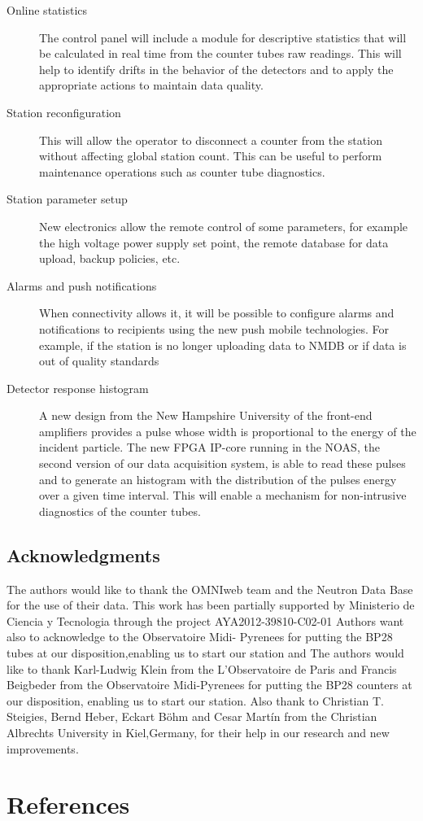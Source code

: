 \documentclass[a4paper]{jpconf}
\begin{document}
\begin{description}
    \item[Online statistics] The control panel will include a module for
        descriptive statistics that will be calculated in real time from the
        counter tubes raw readings. This will help to identify drifts in the
        behavior of the detectors and to apply the appropriate actions to
        maintain data quality.
    \item[Station reconfiguration] This will allow the operator to disconnect a
        counter from the station without affecting global station count. This
        can be useful to perform maintenance operations such as counter tube
        diagnostics. 
    \item[Station parameter setup] New electronics allow the remote control of
        some parameters, for example the high voltage power supply set point,
        the remote database for data upload, backup policies, etc.
    \item[Alarms and push notifications] When connectivity allows it, it will
        be possible to configure alarms and notifications to recipients using
        the new push mobile technologies. For example, if the station is no
        longer uploading data to NMDB or if data is out of quality standards
    \item[Detector response histogram] A new design from the New
        Hampshire University of the front-end amplifiers provides a pulse whose
        width is proportional to the energy of the incident particle. The new
        FPGA IP-core running in the NOAS, the second version of our data
        acquisition system, is able to read these pulses and to generate an
        histogram with the distribution of the pulses energy over a given time
        interval. This will enable a mechanism for non-intrusive diagnostics of
        the counter tubes. 
\end{description}


\subsection*{Acknowledgments} 

The authors would like to thank the OMNIweb team and the Neutron Data Base for
the use of their data. This work has been partially supported by Ministerio de
Ciencia y Tecnologia through the project AYA2012-39810-C02-01 Authors want also
to acknowledge to the Observatoire Midi- Pyrenees for putting the BP28 tubes at
our disposition,enabling us to start our station and The authors would like to
thank Karl-Ludwig Klein from the L’Observatoire de Paris and Francis Beigbeder
from the Observatoire Midi-Pyrenees for putting the BP28 counters at our
disposition, enabling us to start our station. Also thank to Christian T.
Steigies, Bernd Heber, Eckart Böhm and Cesar Martín from the Christian
Albrechts University in Kiel,Germany, for their help in our research and new
improvements.


\section*{References}
 
\end{document}

